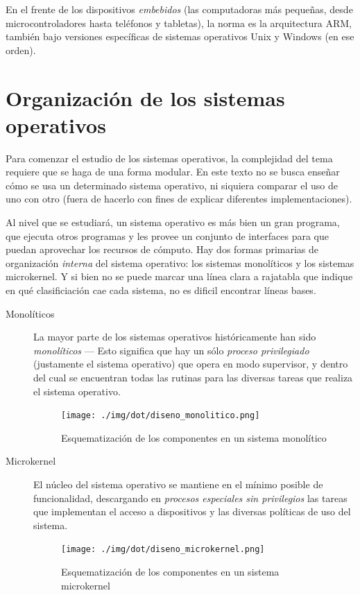 \documentclass[11pt,fleqn]{book} %
\begin{document}
En el frente de los dispositivos \emph{embebidos} (las computadoras más
pequeñas, desde microcontroladores hasta teléfonos y tabletas), la
norma es la arquitectura ARM, también bajo versiones específicas de
sistemas operativos Unix y Windows (en ese orden).
\section{Organización de los sistemas operativos}
\label{sec-1-5}


Para comenzar el estudio de los sistemas operativos, la complejidad
del tema requiere que se haga de una forma modular. En este texto
no se busca enseñar cómo se usa un determinado sistema operativo, ni
siquiera comparar el uso de uno con otro (fuera de hacerlo con fines
de explicar diferentes implementaciones).

Al nivel que se estudiará, un sistema operativo es más bien un
gran programa, que ejecuta otros programas y les provee un
conjunto de interfaces para que puedan aprovechar los recursos de
cómputo. Hay dos formas primarias de organización \emph{interna} del
sistema operativo: los sistemas monolíticos y los sistemas
microkernel. Y si bien no se puede marcar una línea clara a rajatabla
que indique en qué clasificiación cae cada sistema, no es dificil
encontrar líneas bases.

\begin{description}
\item[Monolíticos] La mayor parte de los sistemas operativos
		 históricamente han sido \emph{monolíticos} — Esto
		 significa que hay un sólo \emph{proceso privilegiado} 
	  	 (justamente el sistema operativo) que
		 opera en modo supervisor, y dentro del cual se
		 encuentran todas las rutinas para las diversas tareas
		 que realiza el sistema operativo.

		 \begin{figure}[htb]
		 \centering
		 \texttt{[image: ./img/dot/diseno\_monolitico.png]}
		 \caption{\label{INTRO_diseno_monolitico}Esquematización de los componentes en un sistema monolítico}
		 \end{figure}
\item[Microkernel] El núcleo del sistema operativo se mantiene en el
                 mínimo posible de funcionalidad, descargando en
                 \emph{procesos especiales sin privilegios} las tareas que implementan el
                 acceso a dispositivos y las diversas políticas de uso
                 del sistema.

		 \begin{figure}[htb]
		 \centering
		 \texttt{[image: ./img/dot/diseno\_microkernel.png]}
		 \caption{\label{INTRO_microkernel}Esquematización de los componentes en un sistema microkernel}
		 \end{figure}
\end{description}
\end{document}
